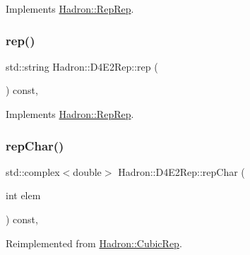 Implements \mbox{\hyperlink{structHadron_1_1RepRep_ab3213025f6de249f7095892109575fde}{Hadron\+::\+Rep\+Rep}}.

\mbox{\label{structHadron_1_1D4E2Rep_aa3fbc4ce5b4a84a739b17fa4bc49e97d}} 
\subsubsection{\texorpdfstring{rep()}{rep()}\hspace{0.1cm}{\footnotesize\ttfamily [3/3]}}
{\footnotesize\ttfamily std\+::string Hadron\+::\+D4\+E2\+Rep\+::rep (\begin{DoxyParamCaption}{ }\end{DoxyParamCaption}) const\hspace{0.3cm}{\ttfamily [inline]}, {\ttfamily [virtual]}}



Implements \mbox{\hyperlink{structHadron_1_1RepRep_ab3213025f6de249f7095892109575fde}{Hadron\+::\+Rep\+Rep}}.

\mbox{\label{structHadron_1_1D4E2Rep_a5f1abc30578bd5d20e32ca5676a86c84}} 
\subsubsection{\texorpdfstring{repChar()}{repChar()}\hspace{0.1cm}{\footnotesize\ttfamily [1/2]}}
{\footnotesize\ttfamily std\+::complex$<$double$>$ Hadron\+::\+D4\+E2\+Rep\+::rep\+Char (\begin{DoxyParamCaption}\item[{int}]{elem }\end{DoxyParamCaption}) const\hspace{0.3cm}{\ttfamily [inline]}, {\ttfamily [virtual]}}



Reimplemented from \mbox{\hyperlink{structHadron_1_1CubicRep_af45227106e8e715e84b0af69cd3b36f8}{Hadron\+::\+Cubic\+Rep}}.

